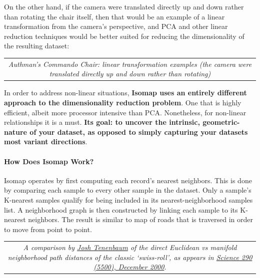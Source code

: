 \documentclass[11pt]{article}
\begin{document}
On the other hand, if the camera were translated directly up and down
rather than rotating the chair itself, then that would be an example of
a linear transformation from the camera's perspective, and PCA and other
linear reduction techniques would be better suited for reducing the
dimensionality of the resulting dataset:

\begin{longtable}[]{@{}c@{}}
\toprule
\begin{minipage}[b]{0.97\columnwidth}\centering
\strut
\end{minipage}\tabularnewline
\midrule
\endhead
\begin{minipage}[t]{0.97\columnwidth}\centering
\emph{Authman's Commando Chair: linear transformation examples (the
camera were translated directly up and down rather than rotating)}\strut
\end{minipage}\tabularnewline
\bottomrule
\end{longtable}

In order to address non-linear situations, \textbf{Isomap uses an
entirely different approach to the dimensionality reduction problem}.
One that is highly efficient, albeit more processor intensive than PCA.
Nonetheless, for non-linear relationships it is a must. \textbf{Its
goal: to uncover the intrinsic, geometric-nature of your dataset, as
opposed to simply capturing your datasets most variant directions}.

\hypertarget{how-does-isomap-work}{%
\paragraph{How Does Isomap Work?}\label{how-does-isomap-work}}

Isomap operates by first computing each record's nearest neighbors. This
is done by comparing each sample to every other sample in the dataset.
Only a sample's K-nearest samples qualify for being included in its
nearest-neighborhood samples list. A neighborhood graph is then
constructed by linking each sample to its K-nearest neighbors. The
result is similar to map of roads that is traversed in order to move
from point to point.

\begin{longtable}[]{@{}c@{}}
\toprule
\begin{minipage}[b]{0.97\columnwidth}\centering
\strut
\end{minipage}\tabularnewline
\midrule
\endhead
\begin{minipage}[t]{0.97\columnwidth}\centering
\emph{A comparison by \href{http://web.mit.edu/cocosci/josh.html}{Josh
Tenenbaum} of the direct Euclidean vs manifold neighborhood path
distances of the classic `swiss-roll', as appears in
\href{http://web.mit.edu/cocosci/Papers/sci_reprint.pdf}{Science 290
(5500), December 2000}.}\strut
\end{minipage}\tabularnewline
\bottomrule
\end{longtable}
\end{document}

